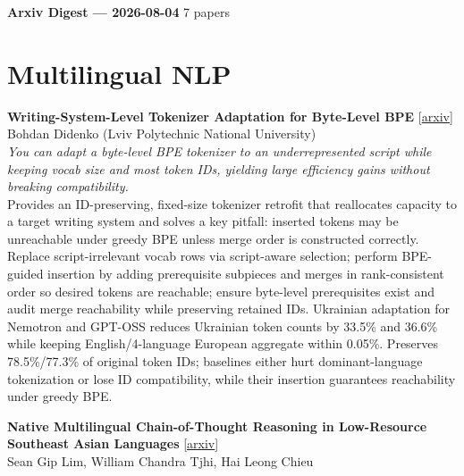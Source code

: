 \documentclass[12pt,letterpaper]{article}
\begin{document}
{\footnotesize\textbf{Arxiv Digest --- 2026-08-04} \hfill 7 papers}

\smallskip

\section*{Multilingual NLP}

{\small\textbf{Writing-System-Level Tokenizer Adaptation for Byte-Level BPE}} {\scriptsize[\href{https://arxiv.org/abs/2608.00582}{arxiv}]}\\
{\scriptsize Bohdan Didenko (Lviv Polytechnic National University)}\\

{\small\textit{You can adapt a byte-level BPE tokenizer to an underrepresented script while keeping vocab size and most token IDs, yielding large efficiency gains without breaking compatibility.}}\\[1pt]
{\footnotesize Provides an ID-preserving, fixed-size tokenizer retrofit that reallocates capacity to a target writing system and solves a key pitfall: inserted tokens may be unreachable under greedy BPE unless merge order is constructed correctly. Replace script-irrelevant vocab rows via script-aware selection; perform BPE-guided insertion by adding prerequisite subpieces and merges in rank-consistent order so desired tokens are reachable; ensure byte-level prerequisites exist and audit merge reachability while preserving retained IDs. Ukrainian adaptation for Nemotron and GPT-OSS reduces Ukrainian token counts by 33.5\% and 36.6\% while keeping English/4-language European aggregate within 0.05\%. Preserves 78.5\%/77.3\% of original token IDs; baselines either hurt dominant-language tokenization or lose ID compatibility, while their insertion guarantees reachability under greedy BPE.}

\medskip

{\small\textbf{Native Multilingual Chain-of-Thought Reasoning in Low-Resource Southeast Asian Languages}} {\scriptsize[\href{https://arxiv.org/abs/2608.00533}{arxiv}]}\\
{\scriptsize Sean Gip Lim, William Chandra Tjhi, Hai Leong Chieu}\\
\end{document}
